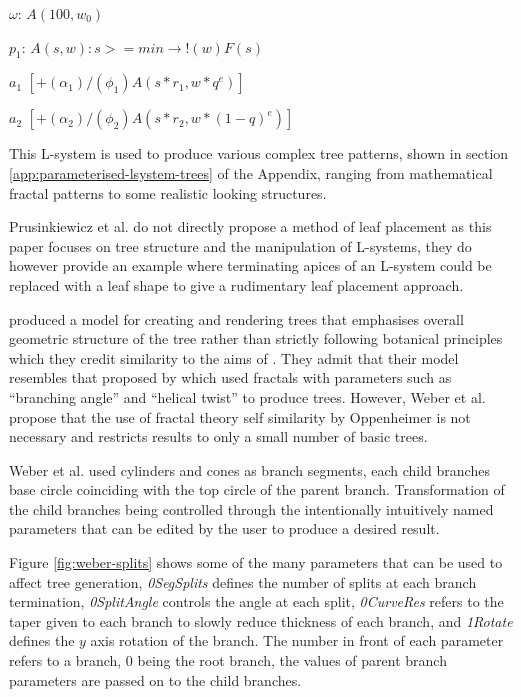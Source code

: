 \documentclass[final]{cmpreport}
\begin{document}
$\omega$: $A(100, w_0)$ 

\indent $p_1$: $A(s, w) : s >= min \rightarrow !(w)F(s)$

\indent $a_1$ $[+(\alpha_1)/(\phi_1)A(s * r_1, w * q ^ e)]$

\indent $a_2$ $[+(\alpha_2)/(\phi_2)A(s * r_2, w * (1 - q) ^ e)]$

This L-system is used to produce various complex tree patterns, shown in section 
\ref{app:parameterised-lsystem-trees} of the Appendix, ranging from mathematical fractal 
patterns to some realistic looking structures.

Prusinkiewicz et al. do not directly propose a method of leaf placement as this 
paper focuses on tree structure and the manipulation of L-systems, they do however provide 
an example where terminating apices of an L-system could be replaced with a leaf shape to 
give a rudimentary leaf placement approach.

\cite{weber1995rendering} produced a model for creating and rendering trees that emphasises 
overall geometric structure of the tree rather than strictly following botanical principles 
which they credit similarity to the aims of \cite{reeves1985approximate}. 
They admit that their model resembles that proposed by \cite{oppenheimer1986real} which used 
fractals with parameters such as ``branching angle'' and ``helical twist'' to produce trees. 
However, Weber et al. propose that the use of fractal theory self similarity by Oppenheimer 
is not necessary and restricts results to only a small number of basic trees.

Weber et al. used cylinders and cones as branch segments, 
each child branches base circle coinciding with the top circle of the parent branch. 
Transformation of the child branches being controlled through the intentionally intuitively named 
parameters that can be edited by the user to produce a desired result.

Figure \ref{fig:weber-splits} shows some of the many parameters that can be used to affect 
tree generation, \emph{0SegSplits} defines the number of splits at each branch termination, 
\emph{0SplitAngle} controls the angle at each split, \emph{0CurveRes} refers to the taper 
given to each branch to slowly reduce thickness of each branch, and \emph{1Rotate} defines 
the $y$ axis rotation of the branch. The number in front of each parameter refers to a branch, 
0 being the root branch, the values of parent branch parameters are passed on to the child 
branches. 
\end{document}
